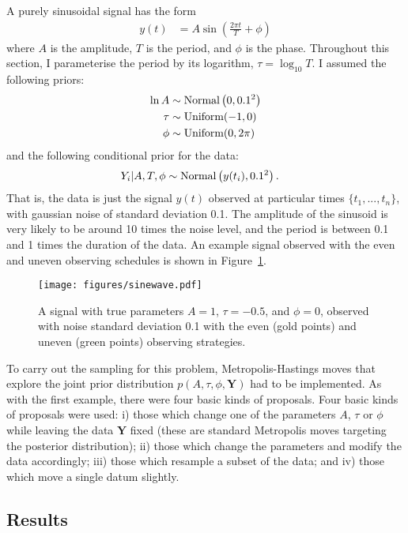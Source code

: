 \documentclass[entropy,article,accept,oneauthor,pdftex,10pt,a4paper]{mdpi}
\begin{document}
A purely sinusoidal signal has the form
\begin{align}
y(t) &= A \sin \left(\frac{2\pi t}{T} + \phi\right)
\end{align}
where $A$ is the amplitude, $T$ is the period, and $\phi$ is the phase.
Throughout this section, I parameterise the period by its logarithm,
$\tau = \log_{10} T$. I assumed the following priors:
\begin{align}
\ln A   &\sim \textnormal{Normal}\left(0, 0.1^2\right)  \\
\tau    &\sim \textnormal{Uniform}(-1, 0)  \\
\phi    &\sim \textnormal{Uniform}(0, 2\pi)
\end{align}
and the following conditional prior for the data:
\begin{align}
Y_i | A, T, \phi &\sim \textnormal{Normal}\left(y(t_i), 0.1^2\right).
\end{align}
That is, the data is just the signal $y(t)$ observed at particular times
$\{t_1, ..., t_n\}$, with gaussian noise of standard deviation 0.1.
The amplitude of the sinusoid is very likely to be around 10 times the
noise level, and the period is between 0.1 and 1 times the duration of
the data. An example signal observed with the even and uneven observing schedules
is shown in Figure~\ref{fig:sinewave}.

\begin{figure}[!ht]
\centering
\texttt{[image: figures/sinewave.pdf]}
\caption{A signal with true parameters $A=1$, $\tau=-0.5$, and
$\phi=0$, observed with noise standard deviation 0.1 with the
even (gold points) and uneven (green points) observing strategies.
\label{fig:sinewave}}
\end{figure}

To carry out the sampling for this problem, Metropolis-Hastings moves that
explore the joint prior distribution $p(A, \tau, \phi, \boldsymbol{Y})$
had to be
implemented. As with the first example, there were four basic kinds of
proposals. Four basic kinds of proposals were used: i) those which change
one of the parameters
$A$, $\tau$ or $\phi$ while leaving the data $\boldsymbol{Y}$ fixed
(these are standard Metropolis moves targeting the posterior distribution);
ii) those which change the parameters and modify the data accordingly;
iii) those which resample a subset
of the data; and iv) those which move a single datum slightly.

\subsection{Results}
\end{document}

